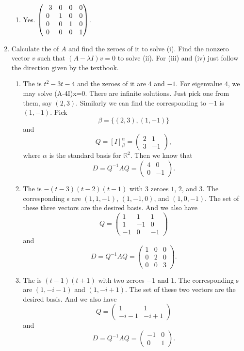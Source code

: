 \begin{enumerate}
\begin{enumerate}
\item Yes. $\begin{pmatrix}-3 & 0 & 0 & 0\cr 0 & 1 & 0 & 0\cr 0 & 0 & 1 & 0\cr 0 & 0 & 0 & 1\end{pmatrix}$.
\end{enumerate}
\item Calculate the \charpoly{} of $A$ and find the zeroes of it to solve (i). Find the nonzero vector $v$ such that $(A-\lambda I)v=0$ to solve (ii). For (iii) and (iv) just follow the direction given by the textbook.
\begin{enumerate}
\item The \charpoly{} is ${t}^{2}-3t-4$ and the zeroes of it are $4$ and $-1$. For eigenvalue $4$, we may solve (A-4I)x=0. There are infinite solutions. Just pick one from them, say $(2,3)$. Similarly we can find the \egve{} corresponding to $-1$ is $(1,-1)$. Pick 
\[\beta=\{(2,3),(1,-1)\}\] 
and 
\[Q=[I]_{\beta}^{\alpha}=\begin{pmatrix}2&1\\3&-1\end{pmatrix},\]
where $\alpha $ is the standard basis for $\mathbb{R}^2$. Then we know that 
\[D=Q^{-1}AQ=\begin{pmatrix}4&0\\0&-1\end{pmatrix}.\]
\item The \charpoly{} is $-\left( t-3\right) \left( t-2\right) \left( t-1\right) $ with $3$ zeroes $1$, $2$, and $3$. The corresponding \egve s are $(1,1,-1)$, $(1,-1,0)$, and $(1,0,-1)$. The set of these three vectors are the desired basis. And we also have 
\[Q=\begin{pmatrix}1&1&1\\1&-1&0\\-1&0&-1\end{pmatrix}\]
and 
\[D=Q^{-1}AQ=\begin{pmatrix}1&0&0\\0&2&0\\0&0&3\end{pmatrix}.\]
\item The \charpoly{} is $\left( t-1\right) \left( t+1\right) $ with two zeroes $-1$ and $1$. The corresponding \egve s are $(1,-i-1)$ and $(1,-i+1)$. The set of these two vectors are the desired basis. And we also have 
\[Q=\begin{pmatrix}1&1\\-i-1&-i+1\end{pmatrix}\]
and 
\[D=Q^{-1}AQ=\begin{pmatrix}-1&0\\0&1\end{pmatrix}.\]

\end{enumerate}
\end{enumerate}
